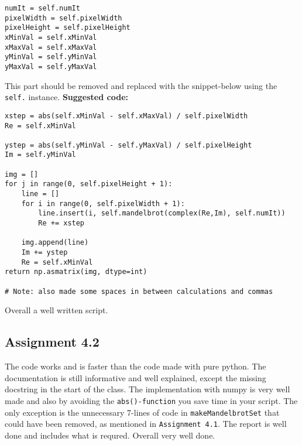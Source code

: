\documentclass[a4paper]{article}
\begin{document}
\begin{verbatim}
numIt = self.numIt   
pixelWidth = self.pixelWidth 
pixelHeight = self.pixelHeight  
xMinVal = self.xMinVal  
xMaxVal = self.xMaxVal  
yMinVal = self.yMinVal  
yMaxVal = self.yMaxVal  
\end{verbatim}
This part should be removed and replaced with the snippet-below using the \texttt{self.} instance.
\newline\newline
\textbf{Suggested code:}
\begin{verbatim}
xstep = abs(self.xMinVal - self.xMaxVal) / self.pixelWidth 
Re = self.xMinVal    

ystep = abs(self.yMinVal - self.yMaxVal) / self.pixelHeight
Im = self.yMinVal 

img = [] 
for j in range(0, self.pixelHeight + 1):
    line = [] 
    for i in range(0, self.pixelWidth + 1):
        line.insert(i, self.mandelbrot(complex(Re,Im), self.numIt))
        Re += xstep

    img.append(line)
    Im += ystep
    Re = self.xMinVal
return np.asmatrix(img, dtype=int)

# Note: also made some spaces in between calculations and commas 
\end{verbatim}
Overall a well written script.


\subsection*{Assignment 4.2} \label{sec:assignment5.2}
The code works and is faster than the code made with pure python.
\newline\newline
The documentation is still informative and well explained, except the missing docstring in the start of the class.
\newline\newline
The implementation with numpy is very well made and also by avoiding the \texttt{abs()-function} you save time in your script. The only exception is the unnecessary 7-lines of code in \texttt{makeMandelbrotSet} that could have been removed, as mentioned in \texttt{Assignment 4.1}.
\newline\newline
The report is well done and includes what is requred.
\newline\newline
Overall very well done.
\end{document}
